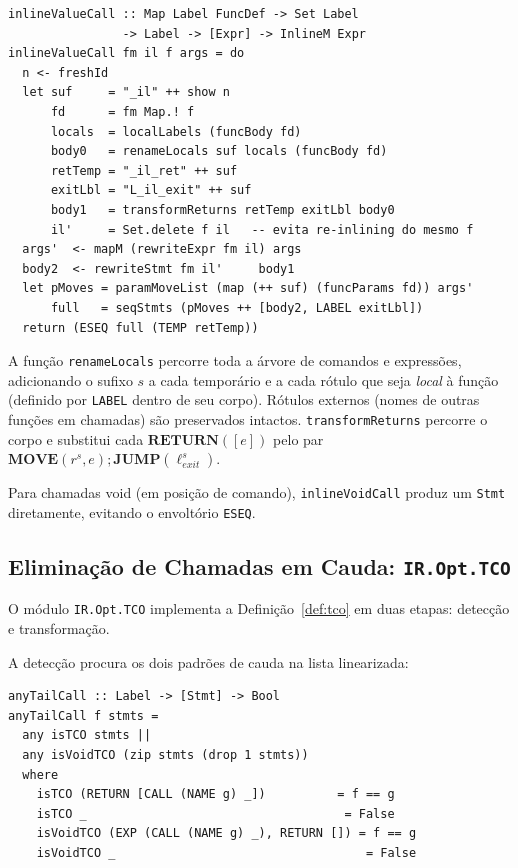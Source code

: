 \begin{verbatim}
inlineValueCall :: Map Label FuncDef -> Set Label
                -> Label -> [Expr] -> InlineM Expr
inlineValueCall fm il f args = do
  n <- freshId
  let suf     = "_il" ++ show n
      fd      = fm Map.! f
      locals  = localLabels (funcBody fd)
      body0   = renameLocals suf locals (funcBody fd)
      retTemp = "_il_ret" ++ suf
      exitLbl = "L_il_exit" ++ suf
      body1   = transformReturns retTemp exitLbl body0
      il'     = Set.delete f il   -- evita re-inlining do mesmo f
  args'  <- mapM (rewriteExpr fm il) args
  body2  <- rewriteStmt fm il'     body1
  let pMoves = paramMoveList (map (++ suf) (funcParams fd)) args'
      full   = seqStmts (pMoves ++ [body2, LABEL exitLbl])
  return (ESEQ full (TEMP retTemp))
\end{verbatim}

A função \texttt{renameLocals} percorre toda a árvore de comandos e expressões,
adicionando o sufixo $s$ a cada temporário e a cada rótulo que seja \emph{local}
à função (definido por \texttt{LABEL} dentro de seu corpo).  Rótulos externos
(nomes de outras funções em chamadas) são preservados intactos.
\texttt{transformReturns} percorre o corpo e substitui cada
$\mathbf{RETURN}([e])$ pelo par $\mathbf{MOVE}(r^s, e) \mathbin{;}
\mathbf{JUMP}(\ell_\mathit{exit}^s)$.

Para chamadas void (em posição de comando), \texttt{inlineVoidCall} produz um
\texttt{Stmt} diretamente, evitando o envoltório \texttt{ESEQ}.

\subsection{Eliminação de Chamadas em Cauda:
\texttt{IR.Opt.TCO}}\label{sec:impl-tco}

O módulo \texttt{IR.Opt.TCO} implementa a Definição~\ref{def:tco} em duas
etapas: detecção e transformação.

A detecção procura os dois padrões de cauda na lista linearizada:

\begin{verbatim}
anyTailCall :: Label -> [Stmt] -> Bool
anyTailCall f stmts =
  any isTCO stmts ||
  any isVoidTCO (zip stmts (drop 1 stmts))
  where
    isTCO (RETURN [CALL (NAME g) _])          = f == g
    isTCO _                                    = False
    isVoidTCO (EXP (CALL (NAME g) _), RETURN []) = f == g
    isVoidTCO _                                   = False
\end{verbatim}

